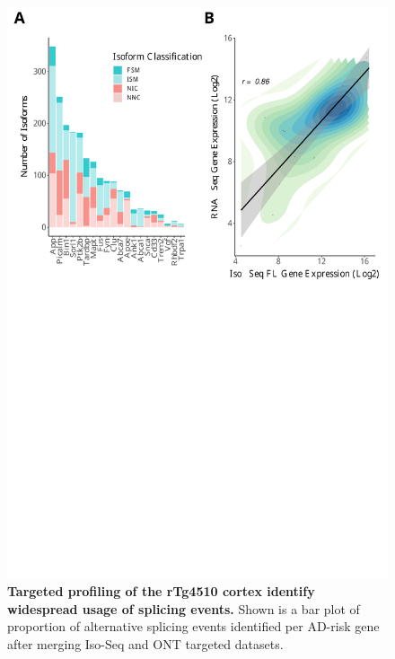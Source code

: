 \begin{figure}[]
	\centering
	\includegraphics[page=9,trim={0 26cm 0 0cm},clip,scale = 0.55]{Figures/ONTvsIsoSeq.pdf}
	\captionsetup{width=0.95\textwidth}
	\caption[Merged splicing landscape from Iso-Seq and ONT targeted profiling]%
	{\textbf{Targeted profiling of the rTg4510 cortex identify widespread usage of splicing events.} Shown is a bar plot of proportion of alternative splicing events identified per AD-risk gene after merging Iso-Seq and ONT targeted datasets.}
	\label{fig:AS_targeted}
\end{figure}

